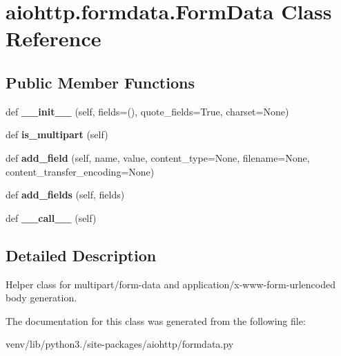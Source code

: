 \hypertarget{classaiohttp_1_1formdata_1_1_form_data}{}\section{aiohttp.\+formdata.\+Form\+Data Class Reference}
\label{classaiohttp_1_1formdata_1_1_form_data}
\subsection*{Public Member Functions}
\begin{DoxyCompactItemize}
\item 
\mbox{\label{classaiohttp_1_1formdata_1_1_form_data_a92efe7b762bfd0a3619bfe4517a972fb}} 
def {\bfseries \+\_\+\+\_\+init\+\_\+\+\_\+} (self, fields=(), quote\+\_\+fields=True, charset=None)
\item 
\mbox{\label{classaiohttp_1_1formdata_1_1_form_data_a454d947ea608f41ddb18c3705519997a}} 
def {\bfseries is\+\_\+multipart} (self)
\item 
\mbox{\label{classaiohttp_1_1formdata_1_1_form_data_a7456489913e02a8ef7e04961947cbad8}} 
def {\bfseries add\+\_\+field} (self, name, value, content\+\_\+type=None, filename=None, content\+\_\+transfer\+\_\+encoding=None)
\item 
\mbox{\label{classaiohttp_1_1formdata_1_1_form_data_a026d02c32e2d4103bb810986cc450cae}} 
def {\bfseries add\+\_\+fields} (self, fields)
\item 
\mbox{\label{classaiohttp_1_1formdata_1_1_form_data_a8cfaa6a2016dae0c979be50f40fea8b8}} 
def {\bfseries \+\_\+\+\_\+call\+\_\+\+\_\+} (self)
\end{DoxyCompactItemize}


\subsection{Detailed Description}
\begin{DoxyVerb}Helper class for multipart/form-data and
application/x-www-form-urlencoded body generation.\end{DoxyVerb}
 

The documentation for this class was generated from the following file\+:\begin{DoxyCompactItemize}
\item 
venv/lib/python3./site-\/packages/aiohttp/formdata.\+py\end{DoxyCompactItemize}
